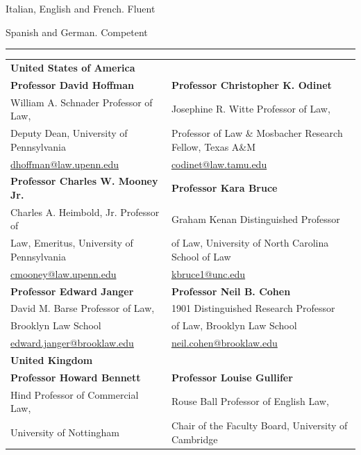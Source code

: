 \documentclass[
  11pt,
  letterpaper]{article}
\begin{document}
\noindent Italian, English and French. Fluent

\vspace{0.3em}

\noindent Spanish and German. Competent

\vspace{0.25em}\hrule\vspace{0.7em}

\begin{tabular}{p{} p{}}
\textbf{United States of America} & \\[0.5em]
\textbf{Professor David Hoffman} & \textbf{Professor Christopher K. Odinet} \\
William A. Schnader Professor of Law, & Josephine R. Witte Professor of Law, \\
Deputy Dean, University of Pennsylvania & Professor of Law \& Mosbacher Research Fellow, Texas A\&M \\
\href{mailto:dhoffman@law.upenn.edu}{dhoffman@law.upenn.edu} & \href{mailto:codinet@law.tamu.edu}{codinet@law.tamu.edu} \\[0.8em]
\textbf{Professor Charles W. Mooney Jr.} & \textbf{Professor Kara Bruce} \\
Charles A. Heimbold, Jr. Professor of & Graham Kenan Distinguished Professor \\
Law, Emeritus, University of Pennsylvania & of Law, University of North Carolina School of Law \\
\href{mailto:cmooney@law.upenn.edu}{cmooney@law.upenn.edu} & \href{mailto:kbruce1@unc.edu}{kbruce1@unc.edu} \\[0.8em]
\textbf{Professor Edward Janger} & \textbf{Professor Neil B. Cohen} \\
David M. Barse Professor of Law, & 1901 Distinguished Research Professor \\
Brooklyn Law School & of Law, Brooklyn Law School \\
\href{mailto:edward.janger@brooklaw.edu}{edward.janger@brooklaw.edu} & \href{mailto:neil.cohen@brooklaw.edu}{neil.cohen@brooklaw.edu} \\[1em]
\textbf{United Kingdom} & \\[0.5em]
\textbf{Professor Howard Bennett} & \textbf{Professor Louise Gullifer} \\
Hind Professor of Commercial Law, & Rouse Ball Professor of English Law, \\
University of Nottingham & Chair of the Faculty Board, University of Cambridge \\

\end{tabular}
\end{document}
